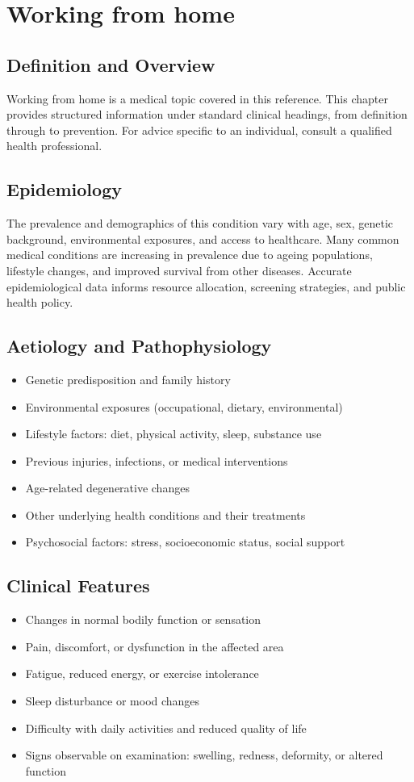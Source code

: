 \chapter{Working from home}

\section*{Definition and Overview}
Working from home is a medical topic covered in this reference. This chapter provides structured information under standard clinical headings, from definition through to prevention. For advice specific to an individual, consult a qualified health professional.

\section*{Epidemiology}
The prevalence and demographics of this condition vary with age, sex, genetic background, environmental exposures, and access to healthcare. Many common medical conditions are increasing in prevalence due to ageing populations, lifestyle changes, and improved survival from other diseases. Accurate epidemiological data informs resource allocation, screening strategies, and public health policy.

\section*{Aetiology and Pathophysiology}
\begin{itemize}
    \item Genetic predisposition and family history
    \item Environmental exposures (occupational, dietary, environmental)
    \item Lifestyle factors: diet, physical activity, sleep, substance use
    \item Previous injuries, infections, or medical interventions
    \item Age-related degenerative changes
    \item Other underlying health conditions and their treatments
    \item Psychosocial factors: stress, socioeconomic status, social support
\end{itemize}

\section*{Clinical Features}
\begin{itemize}
    \item Changes in normal bodily function or sensation
    \item Pain, discomfort, or dysfunction in the affected area
    \item Fatigue, reduced energy, or exercise intolerance
    \item Sleep disturbance or mood changes
    \item Difficulty with daily activities and reduced quality of life
    \item Signs observable on examination: swelling, redness, deformity, or altered function
\end{itemize}


